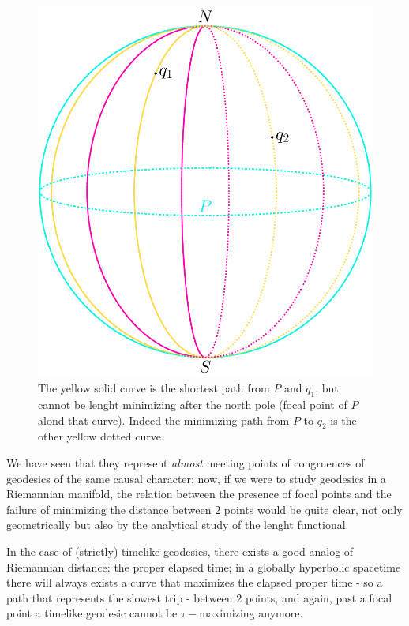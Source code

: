 \begin{figure}
\centering
\includegraphics[scale=0.42]{Immagini/sphere-focal-points/sphere-focal-points.pdf}
\caption[]{The yellow solid curve is the shortest path from \(P\) and \(q_1\), but cannot be lenght minimizing after the north pole (focal point of \(P\) alond that curve). Indeed the minimizing path from \(P\) to \(q_2\) is the other yellow dotted curve.}
\label{fig:sphere-focal-points}
\end{figure}

We have seen that they represent \emph{almost} meeting points of congruences of geodesics of the same causal character; now, if we were to study geodesics in a Riemannian manifold, the relation between the presence of focal points and the failure of minimizing the distance between \(2\) points would be quite clear, not only geometrically but also by the analytical study of the lenght functional.

In the case of (strictly) timelike geodesics, there exists a good analog of Riemannian distance: the proper elapsed time; in a globally hyperbolic spacetime there will always exists a curve that maximizes the elapsed proper time - so a path that represents the slowest trip - between \(2\) points, and again, past a focal point a timelike geodesic cannot be \(\tau-\)maximizing anymore.

